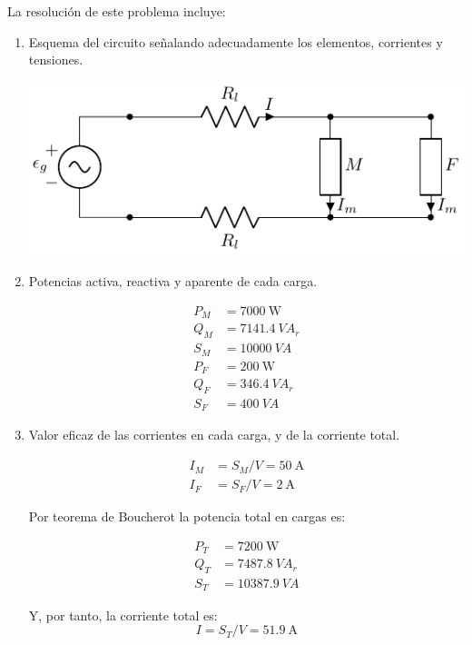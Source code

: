 \documentclass[12pt]{article}
\begin{document}
La resolución de este problema incluye: 
\begin{enumerate}
\item Esquema del circuito señalando adecuadamente los elementos,
  corrientes y tensiones.

    
  \begin{center}
    \includegraphics{figs/circuito_cargas.pdf}
  \end{center}
  
\item Potencias activa, reactiva y aparente de cada carga.

\begin{align*}
  P_M &= \SI{7000}{\watt}\\
  Q_M &= \SI{7141.4}{VA}_r\\
  S_M &= \SI{10000}{VA}\\
  P_F &= \SI{200}{\watt}\\
  Q_F &= \SI{346.4}{VA}_r\\
  S_F &= \SI{400}{VA}
\end{align*}

\item Valor eficaz de las corrientes en cada carga, y de la corriente
  total.

  \begin{align*}
    I_M &= S_M / V = \SI{50}{\ampere}\\
    I_F &= S_F / V = \SI{2}{\ampere}
  \end{align*}

  Por teorema de Boucherot la potencia total en cargas es:

\begin{align*}
  P_T &= \SI{7200}{\watt}\\
  Q_T &= \SI{7487.8}{VA}_r\\
  S_T &= \SI{10387.9}{VA}
\end{align*}

Y, por tanto, la corriente total es:
\[
  I = S_T / V = \SI{51.9}{\ampere}
\]


\end{enumerate}
\end{document}
